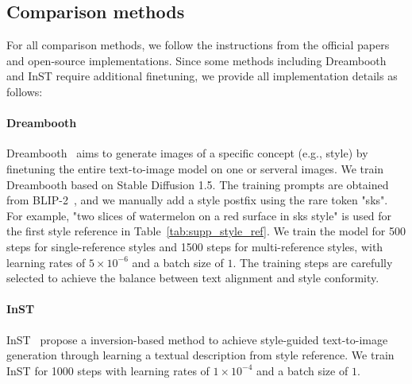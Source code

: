 \subsection{Comparison methods}

For all comparison methods, we follow the instructions from the official papers and open-source implementations. Since some methods including Dreambooth and InST require additional finetuning, we provide all implementation details as follows:

\paragraph{Dreambooth} \label{sec:supp_train_dreambooth} Dreambooth~\cite{dreambooth} aims to generate images of a specific concept (e.g., style) by finetuning the entire text-to-image model on one or serveral images. We train Dreambooth based on Stable Diffusion 1.5. The training prompts are obtained from BLIP-2~\cite{li2023blip2}, and we manually add a style postfix using the rare token "sks". For example, "two slices of watermelon on a red surface in sks style" is used for the first style reference in Table~\ref{tab:supp_style_ref}. We train the model for 500 steps for single-reference styles and 1500 steps for multi-reference styles, with learning rates of $5 \times 10^{-6}$ and a batch size of $1$. The training steps are carefully selected to achieve the balance between text alignment and style conformity. 


\paragraph{InST} InST~\cite{zhang2023inversion} propose a inversion-based method to achieve style-guided text-to-image generation through learning a textual description from style reference. We train InST for 1000 steps with learning rates of $1 \times 10^{-4}$ and a batch size of $1$.

